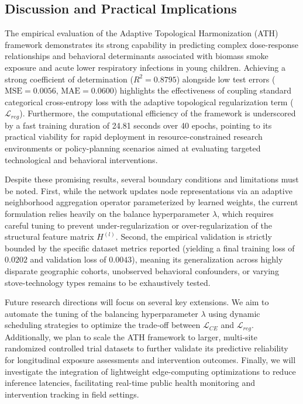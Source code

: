 \documentclass[10pt,twocolumn]{article}
\begin{document}
\subsection{Discussion and Practical Implications}
The empirical evaluation of the Adaptive Topological Harmonization (ATH) framework demonstrates its strong capability in predicting complex dose-response relationships and behavioral determinants associated with biomass smoke exposure and acute lower respiratory infections in young children. Achieving a strong coefficient of determination ($R^2 = 0.8795$) alongside low test errors ($\text{MSE} = 0.0056$, $\text{MAE} = 0.0600$) highlights the effectiveness of coupling standard categorical cross-entropy loss with the adaptive topological regularization term ($\mathcal{L}_{reg}$). Furthermore, the computational efficiency of the framework is underscored by a fast training duration of 24.81 seconds over 40 epochs, pointing to its practical viability for rapid deployment in resource-constrained research environments or policy-planning scenarios aimed at evaluating targeted technological and behavioral interventions.


Despite these promising results, several boundary conditions and limitations must be noted. First, while the network updates node representations via an adaptive neighborhood aggregation operator parameterized by learned weights, the current formulation relies heavily on the balance hyperparameter $\lambda$, which requires careful tuning to prevent under-regularization or over-regularization of the structural feature matrix $H^{(l)}$. Second, the empirical validation is strictly bounded by the specific dataset metrics reported (yielding a final training loss of $0.0202$ and validation loss of $0.0043$), meaning its generalization across highly disparate geographic cohorts, unobserved behavioral confounders, or varying stove-technology types remains to be exhaustively tested. 


Future research directions will focus on several key extensions. We aim to automate the tuning of the balancing hyperparameter $\lambda$ using dynamic scheduling strategies to optimize the trade-off between $\mathcal{L}_{CE}$ and $\mathcal{L}_{reg}$. Additionally, we plan to scale the ATH framework to larger, multi-site randomized controlled trial datasets to further validate its predictive reliability for longitudinal exposure assessments and intervention outcomes. Finally, we will investigate the integration of lightweight edge-computing optimizations to reduce inference latencies, facilitating real-time public health monitoring and intervention tracking in field settings.
\end{document}
